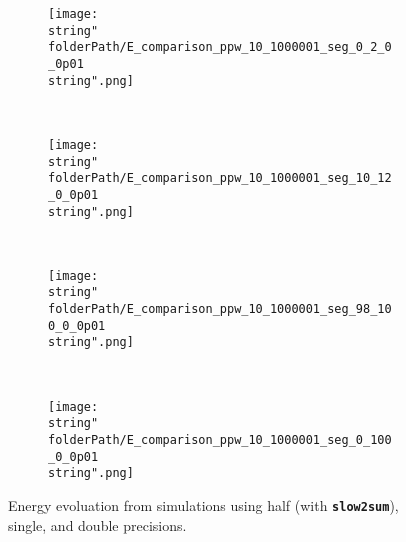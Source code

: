 \begin{figure}[H]
\captionsetup{width=0.95\textwidth,font=footnotesize,labelfont=footnotesize}
\centering
%
\begin{subfigure}[b]{1\textwidth}
%
\centering\texttt{[image: \\string"\\folderPath/E\_comparison\_ppw\_10\_1000001\_seg\_0\_2\_0\_0p01\\string".png]}
%
\end{subfigure}\hfill
\\[2ex]
%
\begin{subfigure}[b]{1\textwidth}
%
\centering\texttt{[image: \\string"\\folderPath/E\_comparison\_ppw\_10\_1000001\_seg\_10\_12\_0\_0p01\\string".png]}
%
\end{subfigure}\hfill
\\[2ex]
%
\begin{subfigure}[b]{1\textwidth}
%
\centering\texttt{[image: \\string"\\folderPath/E\_comparison\_ppw\_10\_1000001\_seg\_98\_100\_0\_0p01\\string".png]}
%
\end{subfigure}\hfill
\\[2ex]
%
\begin{subfigure}[b]{1\textwidth}
%
\centering\texttt{[image: \\string"\\folderPath/E\_comparison\_ppw\_10\_1000001\_seg\_0\_100\_0\_0p01\\string".png]}
%
\end{subfigure}\hfill
%
\caption{Energy evoluation from simulations using half (with \textbf{\texttt{\footnotesize slow2sum}}), single, and double precisions.}
\label{comparison_E_half_compensated_single_double_marmousi2_0_0p01}
\end{figure}

\renewcommand{\folderPath}{\string"/dev/null\string"}